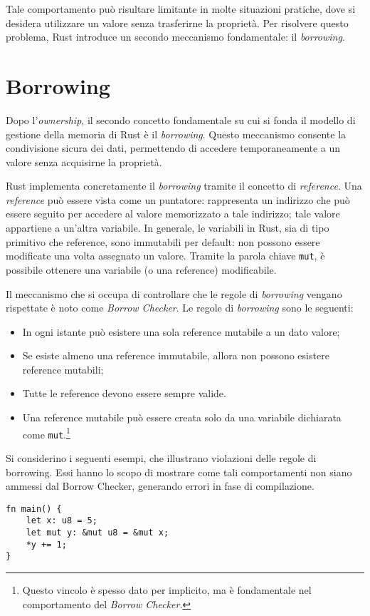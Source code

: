 Tale comportamento può risultare limitante in molte situazioni pratiche, dove si desidera utilizzare un valore senza trasferirne la proprietà. Per risolvere questo problema, Rust introduce un secondo meccanismo fondamentale: il \textit{borrowing}.

\section{Borrowing}
Dopo l'\textit{ownership}, il secondo concetto fondamentale su cui si fonda il modello di gestione della memoria di Rust è il \textit{borrowing}. Questo meccanismo consente la condivisione sicura dei dati, permettendo di accedere temporaneamente a un valore senza acquisirne la proprietà.

Rust implementa concretamente il \textit{borrowing} tramite il concetto di \textit{reference}. Una \textit{reference} può essere vista come un puntatore: rappresenta un indirizzo che può essere seguito per accedere al valore memorizzato a tale indirizzo; tale valore appartiene a un'altra variabile.
\break  \break
\noindent In generale, le variabili in Rust, sia di tipo primitivo che reference, sono immutabili per default: non possono essere modificate una volta assegnato un valore. Tramite la parola chiave \texttt{mut}, è possibile ottenere una variabile (o una reference) modificabile. \hfill \break

\noindent Il meccanismo che si occupa di controllare che le regole di \textit{borrowing} vengano rispettate è noto come \textit{Borrow Checker}. Le regole di \textit{borrowing} sono le seguenti:
\begin{itemize}
    \item In ogni istante può esistere una sola reference mutabile a un dato valore;
    \item Se esiste almeno una reference immutabile, allora non possono esistere reference mutabili;
    \item Tutte le reference devono essere sempre valide.
    \item Una reference mutabile può essere creata solo da una variabile dichiarata come \texttt{mut}.\footnote{Questo vincolo è spesso dato per implicito, ma è fondamentale nel comportamento del \textit{Borrow Checker}.}
\end{itemize}
Si considerino i seguenti esempi, che illustrano violazioni delle regole di borrowing. Essi hanno lo scopo di mostrare come tali comportamenti non siano ammessi dal Borrow Checker, generando errori in fase di compilazione.
\begin{lstlisting}[style=ruststyle, caption={Reference mutabile a variabile immutabile}, label={borrow:mut-from-unmut}]
fn main() {
    let x: u8 = 5;
    let mut y: &mut u8 = &mut x;
    *y += 1;
}
\end{lstlisting}

